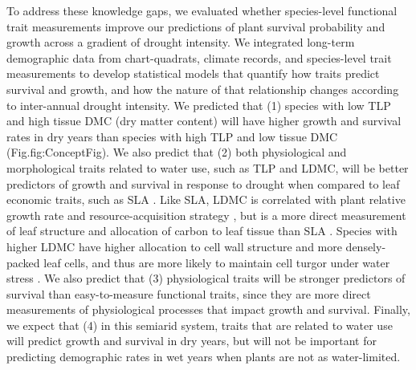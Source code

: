 \documentclass[12pt, letterpaper]{article}
\begin{document}
To address these knowledge gaps, we evaluated whether species-level functional trait measurements improve our predictions of plant survival probability and growth across a gradient of drought intensity. We integrated long-term demographic data from chart-quadrats, climate records, and species-level trait measurements to develop statistical models that quantify how traits predict survival and growth, and how the nature of that relationship changes according to inter-annual drought intensity. We predicted that (1) species with low TLP and high tissue DMC (dry matter content) will have higher growth and survival rates in dry years than species with high TLP and low tissue DMC (Fig.{fig:ConceptFig}). We also predict that (2) both physiological and morphological traits related to water use, such as TLP and LDMC, will be better predictors of growth and survival in response to drought when compared to leaf economic traits, such as SLA \citep{Wright2004, Reich2014}. Like SLA, LDMC is correlated with plant relative growth rate and resource-acquisition strategy \citep{Weiher1999ChallengingEcology}, but is a more direct measurement of leaf structure and allocation of carbon to leaf tissue than SLA \citep{Niinemets1999ComponentsPlants,Hodgson2011}. Species with higher LDMC have higher allocation to cell wall structure and more densely-packed leaf cells, and thus are more likely to maintain cell turgor under water stress \citep{Niinemets2001Global-scaleShrubs,Poorter2009CausesMeta-analysis,Wilcox2020PlantPrairie}. We also predict that (3) physiological traits will be stronger predictors of survival than easy-to-measure functional traits, since they are more direct measurements of physiological processes that impact growth and survival. Finally, we expect that (4) in this semiarid system, traits that are related to water use will predict growth and survival in dry years, but will not be important for predicting demographic rates in wet years when plants are not as water-limited. 
\end{document}
